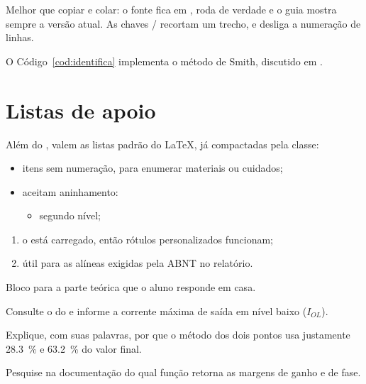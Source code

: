 
Melhor que copiar e colar: o fonte fica em , roda de verdade e o guia
mostra sempre a versão atual. As chaves / recortam
um trecho, e  desliga a numeração de linhas.


O Código~\ref{cod:identifica} implementa o método de Smith, discutido em
\textcite{astrom2008pid}.

\section{Listas de apoio}

Além do , valem as listas padrão do \LaTeX, já compactadas pela
classe:

\begin{itemize}
  \item itens sem numeração, para enumerar materiais ou cuidados;
  \item aceitam aninhamento:
    \begin{itemize}
      \item segundo nível;
    \end{itemize}
\end{itemize}

\begin{enumerate}[label=\alph*),leftmargin=1.2cm]
  \item o  está carregado, então rótulos personalizados funcionam;
  \item útil para as alíneas exigidas pela ABNT no relatório.
\end{enumerate}

\pesquisa

Bloco para a parte teórica que o aluno responde em casa.

\begin{roteiro}
  \item Consulte o  do  \cite{sn7400} e informe a
        corrente máxima de saída em nível baixo ($I_{OL}$).

  \item Explique, com suas palavras, por que o método dos dois pontos usa
        justamente \qty{28,3}{\percent} e \qty{63,2}{\percent} do valor final.

  \item Pesquise na documentação do 
        \cite{mathworks-cst} qual função retorna as margens de ganho e de fase.
\end{roteiro}

